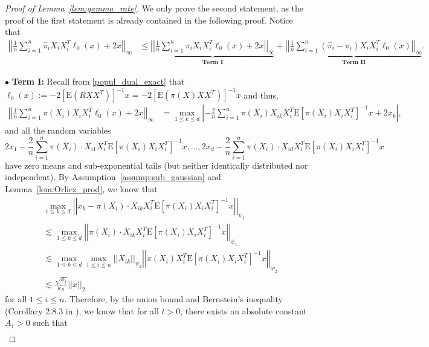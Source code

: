 \documentclass[ejsv2,noshowframe]{imsart}
\theoremstyle{plain}
\theoremstyle{definition}
\theoremstyle{remark}
\newcommand{\norm}[1]{\left|\left| #1 \right|\right|}
\renewcommand{\hat}{\widehat}
\begin{document}
\begin{proof}[Proof of Lemma~\ref{lem:gamma_rate}]
	We only prove the second statement, as the proof of the first statement is already contained in the following proof. Notice that 
	\begin{align*}
		\norm{\frac{1}{n}\sum_{i=1}^n \hat{\pi}_i X_i X_i^T \ell_0(x) + 2x}_{\infty} &\leq \underbrace{\norm{\frac{1}{n}\sum_{i=1}^n \pi_i X_i X_i^T \ell_0(x) + 2x}_{\infty}}_{\textbf{Term I}} + \underbrace{\norm{\frac{1}{n}\sum_{i=1}^n \left(\hat{\pi}_i - \pi_i\right) X_i X_i^T \ell_0(x)}_{\infty}}_{\textbf{Term II}}.
	\end{align*}
	
	$\bullet$ \textbf{Term I:} Recall from \eqref{popul_dual_exact} that $\ell_0(x) := -2\left[\mathrm{E}\left(R XX^T\right)\right]^{-1} x = -2\left[\mathrm{E}\left(\pi(X) XX^T\right)\right]^{-1} x$ and thus,
	\begin{align*}
		\norm{\frac{1}{n}\sum_{i=1}^n \pi(X_i) X_iX_i^T \ell_0(x) + 2x}_{\infty} &= \max_{1\leq k \leq d}\left|-\frac{2}{n}\sum_{i=1}^n \pi(X_i) X_{ik}X_i^T \mathrm{E}\left[\pi(X_i)X_iX_i^T\right]^{-1} x + 2x_k \right|,
	\end{align*}
	and all the random variables
	$$2x_1 - \frac{2}{n}\sum_{i=1}^n \pi(X_i) \cdot X_{i1}X_i^T \mathrm{E}\left[\pi(X_i)X_iX_i^T\right]^{-1} x,\dots, 2x_d - \frac{2}{n}\sum_{i=1}^n \pi(X_i) \cdot X_{id}X_i^T \mathrm{E}\left[\pi(X_i)X_iX_i^T\right]^{-1} x$$
	have zero means and sub-exponential tails (but neither identically distributed nor independent). By Assumption~\ref{assump:sub_gaussian} and Lemma~\ref{lem:Orlicz_prod}, we know that
	\begin{align*}
		&\max_{1\leq k \leq d} \norm{x_k - \pi(X_i) \cdot X_{ik}X_i^T \mathrm{E}\left[\pi(X_i)X_iX_i^T\right]^{-1} x}_{\psi_1}\\
		&\lesssim \max_{1\leq k \leq d} \norm{\pi(X_i) \cdot X_{ik}X_i^T \mathrm{E}\left[\pi(X_i)X_iX_i^T\right]^{-1} x}_{\psi_1}\\
		&\lesssim \max_{1\leq k \leq d} \max_{1\leq i \leq n}\norm{X_{ik}}_{\psi_2} \norm{\pi(X_i)X_i^T \mathrm{E}\left[\pi(X_i)X_iX_i^T\right]^{-1} x}_{\psi_2}\\
		&\lesssim \frac{\sqrt{\phi_1}}{\kappa_R} \norm{x}_2
	\end{align*}
	for all $1\leq i \leq n$. Therefore, by the union bound and Bernstein's inequality (Corollary 2.8.3 in \citealt{vershynin2018high}), we know that for all $t>0$, there exists an absolute constant $A_1>0$ such that
	\begin{align*}

\end{align*}
\end{proof}
\end{document}
